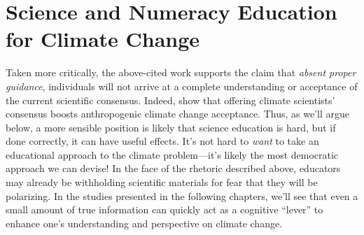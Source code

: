 % 

\section{Science and Numeracy Education for Climate Change}
\label{sec:science-ed}

Taken more critically, the above-cited work supports the claim that \emph{absent
proper guidance}, individuals will not arrive at a complete understanding or
acceptance of the current scientific consensus.  Indeed,
\textcite{lewandowsky_pivotal_2013} show that offering climate scientists'
consensus boosts anthropogenic climate change acceptance.  Thus, as we'll argue
below, a more sensible position is likely that science education is hard, but if
done correctly, it can have useful effects.  It's not hard to \emph{want} to
take an educational approach to the climate problem---it's likely the most
democratic approach we can devise! In the face of the rhetoric described above,
educators may already be withholding scientific materials for fear that they will
be polarizing. In the studies presented in the following chapters, we'll see
that even a small amount of true information can quickly act as a cognitive
``lever'' to enhance one's understanding and perspective on climate change.


